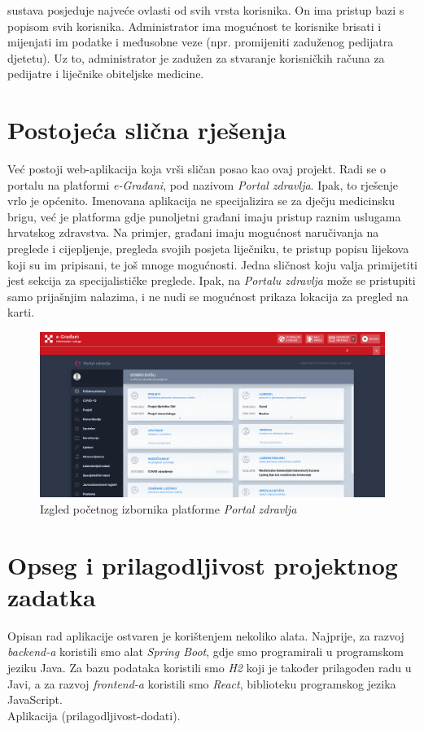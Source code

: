 		 sustava posjeduje najveće ovlasti od svih vrsta korisnika. On ima pristup bazi s popisom svih korisnika. Administrator ima mogućnost te korisnike brisati i mijenjati im podatke i međusobne veze (npr. promijeniti zaduženog pedijatra djetetu). Uz to, administrator je zadužen za stvaranje korisničkih računa za pedijatre i liječnike obiteljske medicine.\\
		
		\section{Postojeća slična rješenja}
		Već postoji web-aplikacija koja vrši sličan posao kao ovaj projekt. Radi se o portalu na platformi \textit{e-Građani}, pod nazivom \textit{Portal zdravlja}. Ipak, to rješenje vrlo je općenito. Imenovana aplikacija ne specijalizira se za dječju medicinsku brigu, već je platforma gdje punoljetni građani imaju pristup raznim uslugama hrvatskog zdravstva. Na primjer, građani imaju mogućnost naručivanja na preglede i cijepljenje, pregleda svojih posjeta liječniku, te pristup popisu lijekova koji su im pripisani, te još mnoge mogućnosti. Jedna sličnost koju valja primijetiti jest sekcija za specijalističke preglede. Ipak, na \textit{Portalu zdravlja} može se pristupiti samo prijašnjim nalazima, i ne nudi se mogućnost prikaza lokacija za pregled na karti.
		\begin{figure}[H]
			\includegraphics[scale=0.4]{slike/portalzdravlje.PNG} %
			\centering
			\caption{Izgled početnog izbornika platforme \textit{Portal zdravlja}}
			\label{fig:portal-zdravlja}
		\end{figure}
		
		\section{Opseg i prilagodljivost projektnog zadatka}
		Opisan rad aplikacije ostvaren je korištenjem nekoliko alata. Najprije, za razvoj \textit{backend-a} koristili smo alat \textit{Spring Boot}, gdje smo programirali u programskom jeziku Java. Za bazu podataka koristili smo \textit{H2} koji je također prilagođen radu u Javi, a za razvoj \textit{frontend-a} koristili smo \textit{React}, biblioteku programskog jezika JavaScript. \\
		Aplikacija (prilagodljivost-dodati).
		
